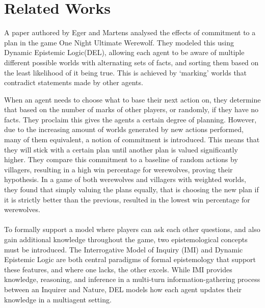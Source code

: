 \section{Related Works}
A paper authored by Eger and Martens\cite{commitment} analysed the effects of
commitment to a plan in the game One Night Ultimate Werewolf. They modeled
this using Dynamic Epistemic Logic(DEL), allowing each agent to be aware of multiple
different possible worlds with alternating sets of facts, and sorting them
based on the least likelihood of it being true. This is achieved by ‘marking’
worlds that contradict statements made by other agents.

When an agent needs to choose what to base their next action on, they determine
that based on the number of marks of other players, or randomly, if they have
no facts. They proclaim this gives the agents a certain degree of planning.
However, due to the increasing amount of worlds generated by new actions
performed, many of them equivalent, a notion of commitment is introduced. This means that they will stick with a certain plan until another plan is valued
significantly higher. They compare this commitment to a baseline of random
actions by villagers, resulting in a high win percentage for werewolves,
proving their hypothesis. In a game of both werewolves and villagers with
weighted worlds, they found that simply valuing the plans equally, that is
choosing the new plan if it is strictly better than the previous, resulted in
the lowest win percentage for werewolves.\\ \\ To formally support a model
where players can ask each other questions, and also gain additional knowledge
throughout the game, two epistemological concepts must be introduced. The
Interrogative Model of Inquiry (IMI) and Dynamic Epistemic Logic are
both central paradigms of formal epistemology that support these features, and
where one lacks, the other excels. While IMI provides knowledge, reasoning, and
inference in a multi-turn information-gathering process between an Inquirer and
Nature, DEL models how each agent updates their knowledge in a multiagent
setting.

